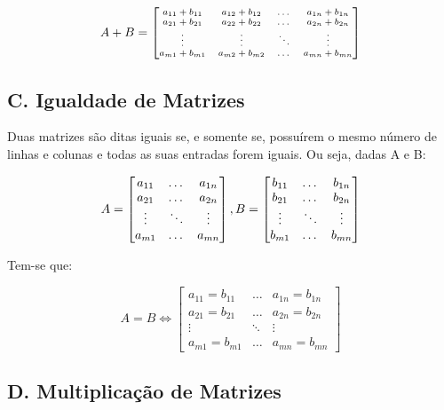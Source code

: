 \documentclass[twocolumn, 10pt]{extarticle}
\begin{document}
\[\scriptsize
A+B=
\begin{bmatrix}
a_{11} + b_{11} & a_{12} + b_{12} & \dots & a_{1n} + b_{1n} \\
a_{21} + b_{21} & a_{22} + b_{22} & \dots & a_{2n} + b_{2n} \\
\vdots & \vdots & \ddots & \vdots \\
a_{m1} + b_{m1} & a_{m2} + b_{m2} & \dots & a_{mn} + b_{mn} 

\end{bmatrix}
\]

\subsection*{C. \quad Igualdade de Matrizes}

Duas matrizes são ditas iguais se, e somente se, possuírem o mesmo número de linhas e colunas e todas as suas entradas forem iguais. Ou seja, dadas A e B:

\[ 
A = 
\begin{bmatrix}
a_{11} & \dots & a_{1n} \\
a_{21} & \dots & a_{2n} \\
\vdots & \ddots & \vdots \\
a_{m1} & \dots & a_{mn} 

\end{bmatrix},  \\ 
B = 
\begin{bmatrix}
b_{11}  & \dots & b_{1n} \\
b_{21}  & \dots & b_{2n} \\
\vdots  & \ddots & \vdots \\
b_{m1}  & \dots & b_{mn} 

\end{bmatrix}
\]

Tem-se que:

\[ 
A = B \iff
\begin{bmatrix}
a_{11} = b_{11}  & \dots & a_{1n} = b_{1n} \\
a_{21} = b_{21}  & \dots & a_{2n} = b_{2n} \\
\vdots & \ddots  & \vdots \\
a_{m1} = b_{m1}  & \dots & a_{mn} = b_{mn} 

\end{bmatrix}
\]

\subsection*{D. \quad Multiplicação de Matrizes}
\end{document}
